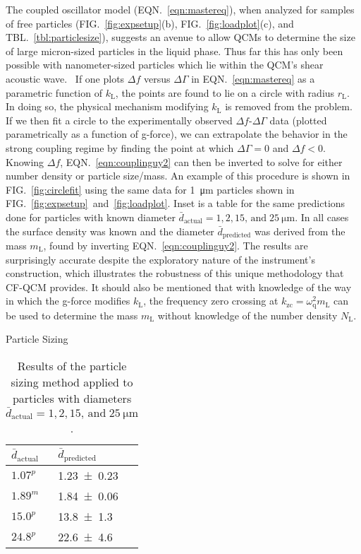 \documentclass[floatfix,superscriptaddress,a4paper,twocolumn]{revtex4-1}
\newcommand{\Figure}[1]{FIG.~\ref{#1}}
\newcommand{\Figures}[2]{FIG.~\ref{#1}~and~\ref{#2}}
\newcommand{\Equation}[1]{EQN.~\ref{#1}}
\newcommand{\Table}[1]{TBL.~\ref{#1}}
\newcommand{\df}{\Delta\!f}
\newcommand{\dg}{\Delta\Gamma}
\newcommand{\kl}{k_\mathrm{L}}
\newcommand{\ml}{m_\mathrm{L}}
\newcommand{\omegaq}{\omega_\mathrm{q}}
\begin{document}
The coupled oscillator model (\Equation{eqn:mastereq}), when analyzed for
samples of free particles (\Figure{fig:expsetup}(b),
\Figure{fig:loadplot}(c), and \Table{tbl:particlesize}), suggests an avenue
to allow QCMs to determine the size of large micron-sized particles in the
liquid phase.  Thus far this has only been possible with nanometer-sized
particles which lie within the QCM's shear acoustic
wave.~\cite{olsson2013using}  If one plots $\df$ versus $\dg$ in
\Equation{eqn:mastereq} as a parametric function of $\kl$, the points are
found to lie on a circle with radius $r_\mathrm{L}$.  In doing so, the physical
mechanism modifying $\kl$ is removed from the problem.
If we then fit a
circle to the experimentally observed $\df$-$\dg$ data (plotted
parametrically as a function of g-force), we can extrapolate the behavior
in the strong coupling regime by finding the point at which $\dg=0$ and
$\df<0$.  Knowing $\df$, \Equation{eqn:couplinguy2} can then be inverted to
solve for either number density or particle size/mass.  An example of this
procedure is shown in \Figure{fig:circlefit} using the same data for
\SI{1}{\micro\meter} particles shown in
\Figures{fig:expsetup}{fig:loadplot}.  Inset is a table for the same
predictions done for particles with known diameter
$\bar{d}_\mathrm{actual}=1, 2, 15,\,\mathrm{and}\;\SI{25}{\micro\meter}$.
In all cases the surface density was known and the diameter
$\bar{d}_\text{predicted}$ was derived from the mass $\ml$, found by
inverting \Equation{eqn:couplinguy2}.  The results are surprisingly accurate
despite the exploratory nature of the instrument's construction, which
illustrates the robustness of this unique methodology that CF-QCM
provides.
It should also be mentioned that with knowledge of the way in which the
g-force modifies $\kl$, the frequency zero crossing at
$k_\mathrm{zc}=\omegaq^2\ml$ can be used to determine the mass $\ml$
without knowledge of the number density $N_\mathrm{L}$. 
\begin{table}[ht]
\centering
Particle Sizing\\
 \begin{tabularx}{80pt}{XX}
 \toprule
 $\bar{d}_\mathrm{actual}$ & $\bar{d}_\mathrm{predicted}$ \\
 \midrule
  $1.07^p$ & \num{1.23+-0.23} \\
  $1.89^m$ & \num{1.84+-0.06} \\
  $15.0^p$ & \num{13.8+-1.3} \\
  $24.8^p$ & \num{22.6+-4.6} \\
 \bottomrule
\end{tabularx}
\caption{Results of the particle sizing method applied to particles with diameters
$\bar{d}_\mathrm{actual}=1, 2, 15,\,\mathrm{and}\;\SI{25}{\micro\meter}$.}
\label{tbl:particlesizing}
\end{table}
\end{document}
